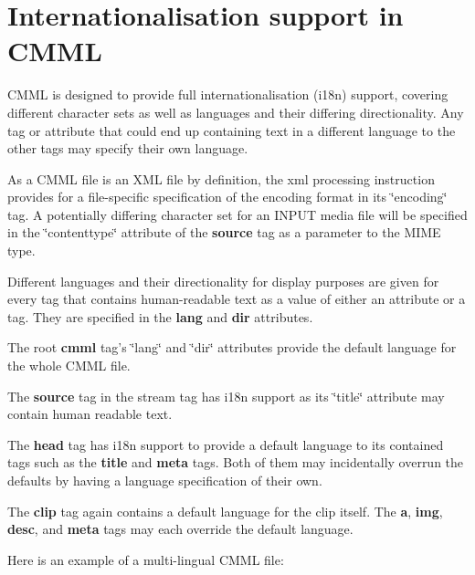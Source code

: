 \section{Internationalisation support in CMML}
\label{group__i18n}
CMML is designed to provide full internationalisation (i18n) support, covering different character sets as well as languages and their differing directionality. Any tag or attribute that could end up containing text in a different language to the other tags may specify their own language.

As a CMML file is an XML file by definition, the xml processing instruction provides for a file-specific specification of the encoding format in its \char`\"{}encoding\char`\"{} tag. A potentially differing character set for an INPUT media file will be specified in the \char`\"{}contenttype\char`\"{} attribute of the {\bf source} tag as a parameter to the MIME type.

Different languages and their directionality for display purposes are given for every tag that contains human-readable text as a value of either an attribute or a tag. They are specified in the {\bf lang} and {\bf dir} attributes.

The root {\bf cmml} tag's \char`\"{}lang\char`\"{} and \char`\"{}dir\char`\"{} attributes provide the default language for the whole CMML file.

The {\bf source} tag in the stream tag has i18n support as its \char`\"{}title\char`\"{} attribute may contain human readable text.

The {\bf head} tag has i18n support to provide a default language to its contained tags such as the {\bf title} and {\bf meta} tags. Both of them may incidentally overrun the defaults by having a language specification of their own.

The {\bf clip} tag again contains a default language for the clip itself. The {\bf a}, {\bf img}, {\bf desc}, and {\bf meta} tags may each override the default language.

Here is an example of a multi-lingual CMML file:



